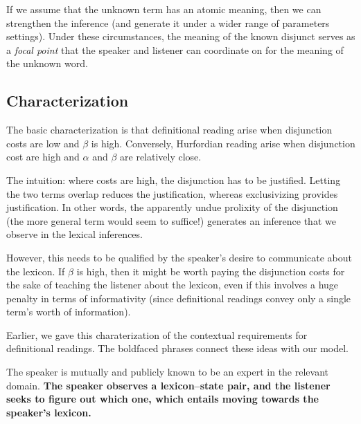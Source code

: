 \documentclass{article}
\begin{document}
\begin{examples}
\item If we assume that the unknown term has an atomic meaning, then
  we can strengthen the inference (and generate it under a wider range
  of parameters settings).  Under these circumstances, the meaning of
  the known disjunct serves as a \emph{focal point} that the speaker
  and listener can coordinate on for the meaning of the unknown word.
\end{examples}


\subsection{Characterization}\label{sec:analysis:characterization}

\begin{examples}
\item The basic characterization is that definitional reading arise
  when disjunction costs are low and $\beta$ is high. Conversely,
  Hurfordian reading arise when disjunction cost are high and $\alpha$
  and $\beta$ are relatively close.
  
\item The intuition: where costs are high, the disjunction has to be
  justified. Letting the two terms overlap reduces the justification,
  whereas exclusivizing provides justification. In other words, the
  apparently undue prolixity of the disjunction (the more general term
  would seem to suffice!) generates an inference that we observe in
  the lexical inferences.
  
\item However, this needs to be qualified by the speaker's desire to
  communicate about the lexicon. If $\beta$ is high, then it might be
  worth paying the disjunction costs for the sake of teaching the
  listener about the lexicon, even if this involves a huge penalty in
  terms of informativity (since definitional readings convey only
  a single term's worth of information).

\item Earlier, we gave this charaterization of the contextual
  requirements for definitional readings. The boldfaced phrases
  connect these ideas with our model.

  \begin{examples}
  \item The speaker is mutually and publicly known to be an expert in
    the relevant domain. \textbf{The speaker observes a lexicon--state
      pair, and the listener seeks to figure out which one, which
      entails moving towards the speaker's lexicon.}      


\end{examples}
\end{examples}
\end{document}
